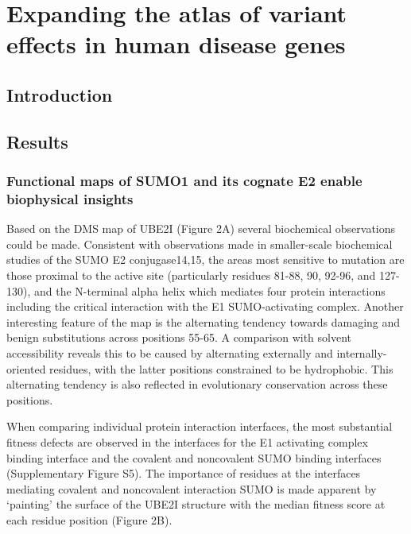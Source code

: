 
\chapter[Expanding the atlas of human disease variants]{Expanding the atlas of variant effects in human disease genes}

\section{Introduction}

\section{Results}

\subsection{Functional maps of SUMO1 and its cognate E2 enable biophysical insights}

Based on the DMS map of UBE2I (Figure 2A) several biochemical observations could be made. Consistent with observations made in smaller-scale biochemical studies of the SUMO E2 conjugase14,15, the areas most sensitive to mutation are those proximal to the active site (particularly residues 81-88, 90, 92-96, and 127-130), and the N-terminal alpha helix which mediates four protein interactions including the critical interaction with the E1 SUMO-activating complex. Another interesting feature of the map is the alternating tendency towards damaging and benign substitutions across positions 55-65. A comparison with solvent accessibility reveals this to be caused by alternating externally and internally-oriented residues, with the latter positions constrained to be hydrophobic. This alternating tendency is also reflected in evolutionary conservation across these positions.

When comparing individual protein interaction interfaces, the most substantial fitness defects are observed in the interfaces for the E1 activating complex binding interface and the  covalent and noncovalent SUMO binding interfaces  (Supplementary Figure S5).  The importance of residues at the interfaces mediating covalent and noncovalent interaction SUMO is made apparent by ‘painting’ the surface of the UBE2I structure with the median fitness score at each residue position (Figure 2B). 

